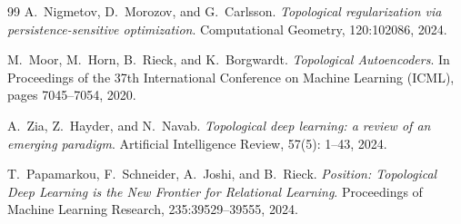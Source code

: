 \documentclass[10pt,leqno]{amsart}
\begin{document}
\begin{thebibliography}{99}
A.~Nigmetov, D.~Morozov, and G.~Carlsson.
\textit{Topological regularization via persistence-sensitive optimization}.
Computational Geometry, 120:102086, 2024.

M.~Moor, M.~Horn, B.~Rieck, and K.~Borgwardt.
\textit{Topological Autoencoders}.
In Proceedings of the 37th International Conference on Machine Learning (ICML), pages 7045--7054, 2020.

A.~Zia, Z.~Hayder, and N.~Navab.
\textit{Topological deep learning: a review of an emerging paradigm}.
Artificial Intelligence Review, 57(5): 1--43, 2024.

T.~Papamarkou, F.~Schneider, A.~Joshi, and B.~Rieck.
\textit{Position: Topological Deep Learning is the New Frontier for Relational Learning}.
Proceedings of Machine Learning Research, 235:39529--39555, 2024.
\end{thebibliography}
\end{document}
